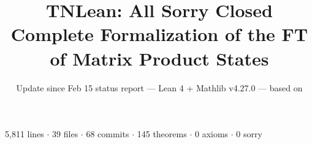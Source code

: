 \documentclass[aspectratio=169,10pt]{beamer}
\title{\textbf{TNLean: All Sorry Closed\\Complete Formalization of the FT of Matrix Product States}}
\subtitle{{\small Update since Feb 15 status report --- Lean 4 + Mathlib v4.27.0 --- based on \cite{Perez-Garcia2007Matrix,Wolf2012Quantum,Evans1978Spectral}}}
\date{}
\author{}
\begin{document}

{%
\begin{frame}
    \vspace{-1.5em}
    \maketitle
    \vspace{-3em}
    \begin{center}
        {\footnotesize
            \textcolor{dimwhite}{5{,}811 lines $\cdot$
            39 files $\cdot$
            68 commits $\cdot$
            \textcolor{leangreen}{145 theorems} $\cdot$
            \textcolor{leangreen}{0 axioms} $\cdot$
            \textcolor{leangreen}{0 sorry}}}
    \end{center}
\end{frame}
}
\end{document}
